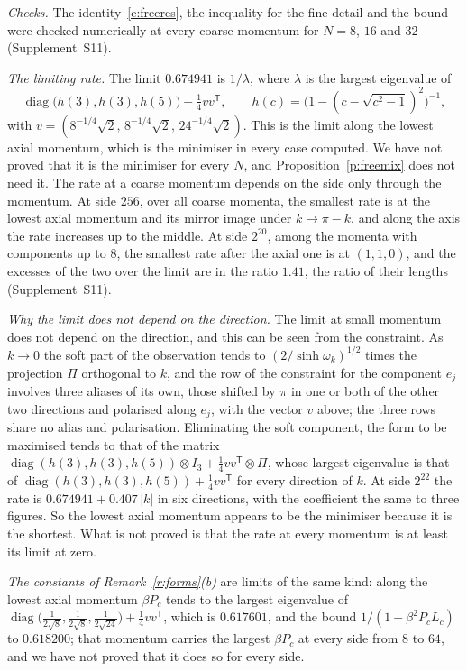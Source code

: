 \emph{Checks.} The identity~\eqref{e:freeres}, the inequality for the fine detail and the bound were checked
numerically at every coarse momentum for $N=8$, $16$ and $32$ (Supplement~S11).

\emph{The limiting rate.} The limit $0.674941$ is $1/\lambda$, where $\lambda$ is the largest eigenvalue of
\[
\operatorname{diag}\big(h(3),h(3),h(5)\big)+\tfrac14vv^{\mathsf T},\qquad
h(c)=\big(1-(c-\sqrt{c^2-1})^2\big)^{-1},
\]
with $v=(8^{-1/4}\sqrt2,\,8^{-1/4}\sqrt2,\,24^{-1/4}\sqrt2)$.
This is the limit along the lowest axial momentum, which is the minimiser in every case computed. We have
not proved that it is the minimiser for every $N$, and Proposition~\ref{p:freemix} does not need it. The
rate at a coarse momentum depends on the side only through the momentum. At side $256$, over all coarse
momenta, the smallest rate is at the lowest axial momentum and its mirror image under $k\mapsto\pi-k$, and
along the axis the rate increases up to the middle. At side $2^{20}$, among the momenta with components up
to $8$, the smallest rate after the axial one is at $(1,1,0)$, and the excesses of the two over the limit
are in the ratio $1.41$, the ratio of their lengths (Supplement~S11).

\emph{Why the limit does not depend on the direction.} The limit at small momentum does not depend on the
direction, and this can be seen from the constraint. As $k\to0$ the soft part of the observation tends to $(2/\sinh\omega_k)^{1/2}$ times the
projection $\Pi$ orthogonal to $k$, and the row of the constraint for the component $e_j$ involves three
aliases of its own, those shifted by $\pi$ in one or both of the other two directions and polarised along
$e_j$, with the vector $v$ above; the three rows share no alias and polarisation. Eliminating the soft
component, the form to be maximised tends to that of the matrix
$\operatorname{diag}(h(3),h(3),h(5))\otimes I_3+\tfrac14vv^{\mathsf T}\otimes\Pi$, whose largest eigenvalue is
that of $\operatorname{diag}(h(3),h(3),h(5))+\tfrac14vv^{\mathsf T}$ for every direction of $k$. At side
$2^{22}$ the rate is $0.674941+0.407\,|k|$ in six directions, with the coefficient the same to three
figures. So the lowest axial momentum appears to be the minimiser because it is the shortest. What is not
proved is that the rate at every momentum is at least its limit at zero.

\emph{The constants of Remark~\ref{r:forms}(b)} are limits of the same kind: along the lowest axial momentum $\beta P_c$ tends to the
largest eigenvalue of
$\operatorname{diag}\big(\tfrac1{2\sqrt8},\tfrac1{2\sqrt8},\tfrac1{2\sqrt{24}}\big)+\tfrac14vv^{\mathsf T}$,
which is $0.617601$, and the bound $1/(1+\beta^2P_cL_c)$ to $0.618200$; that momentum carries the largest
$\beta P_c$ at every side from $8$ to $64$, and we have not proved that it does so for every side.

